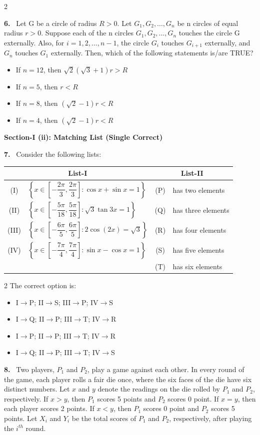 \documentclass[10pt]{extarticle}
\newcommand{\sect}[1]{\par\smallskip\noindent\textbf{#1}\par}
\newcommand{\qn}[1]{\par\smallskip\noindent\textbf{#1.}~}
\newenvironment{qoptions}{\begin{itemize}[leftmargin=1.8em,itemsep=1pt,topsep=2pt,label={}]}{\end{itemize}}
\newcommand{\opt}[2]{\item[(#1)] #2}
\begin{document}
\begin{multicols}{2}
\qn{6} Let G be a circle of radius $R>0$. Let $G_1,G_2,\ldots,G_n$ be n circles of equal radius $r>0$. Suppose each of the n circles $G_1,G_2,\ldots,G_n$ touches the circle G externally. Also, for $i=1,2,\ldots,n-1$, the circle $G_i$ touches $G_{i+1}$ externally, and $G_n$ touches $G_1$ externally. Then, which of the following statements is/are TRUE?
\begin{qoptions}
\opt{A}{If $n=12$, then $\sqrt2(\sqrt3+1)r>R$}
\opt{B}{If $n=5$, then $r<R$}
\opt{C}{If $n=8$, then $(\sqrt2-1)r<R$}
\opt{D}{If $n=4$, then $(\sqrt2-1)r<R$}
\end{qoptions}

\sect{Section-I (ii): Matching List (Single Correct)}

\qn{7} Consider the following lists:
\end{multicols}
\begin{center}
\begin{tabular}{|c|l|c|l|}
\hline
\multicolumn{2}{|c|}{List-I} & \multicolumn{2}{c|}{List-II} \\
\hline
(I) & $\left\{x\in\left[-\dfrac{2\pi}{3},\dfrac{2\pi}{3}\right]:\cos x+\sin x=1\right\}$ & (P) & has two elements \\
\hline
(II) & $\left\{x\in\left[-\dfrac{5\pi}{18},\dfrac{5\pi}{18}\right]:\sqrt3\tan3x=1\right\}$ & (Q) & has three elements \\
\hline
(III) & $\left\{x\in\left[-\dfrac{6\pi}{5},\dfrac{6\pi}{5}\right]:2\cos(2x)=\sqrt3\right\}$ & (R) & has four elements \\
\hline
(IV) & $\left\{x\in\left[-\dfrac{7\pi}{4},\dfrac{7\pi}{4}\right]:\sin x-\cos x=1\right\}$ & (S) & has five elements \\
\hline
& & (T) & has six elements \\
\hline
\end{tabular}
\end{center}
\begin{multicols}{2}
The correct option is:
\begin{qoptions}
\opt{A}{I$\to$P; II$\to$S; III$\to$P; IV$\to$S}
\opt{B}{I$\to$Q; II$\to$P; III$\to$T; IV$\to$R}
\opt{C}{I$\to$P; II$\to$P; III$\to$T; IV$\to$R}
\opt{D}{I$\to$Q; II$\to$P; III$\to$T; IV$\to$S}
\end{qoptions}

\qn{8} Two players, $P_1$ and $P_2$, play a game against each other. In every round of the game, each player rolls a fair die once, where the six faces of the die have six distinct numbers. Let $x$ and $y$ denote the readings on the die rolled by $P_1$ and $P_2$, respectively. If $x>y$, then $P_1$ scores 5 points and $P_2$ scores 0 point. If $x=y$, then each player scores 2 points. If $x<y$, then $P_1$ scores 0 point and $P_2$ scores 5 points. Let $X_i$ and $Y_i$ be the total scores of $P_1$ and $P_2$, respectively, after playing the $i^{th}$ round.
\end{multicols}
\end{document}
